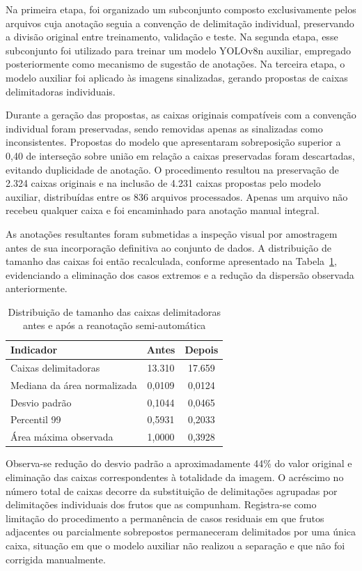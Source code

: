 \documentclass[artigo,times,capa]{iftex2024}
\begin{document}
Na primeira etapa, foi organizado um subconjunto composto exclusivamente
pelos arquivos cuja anotação seguia a convenção de delimitação individual,
preservando a divisão original entre treinamento, validação e teste. Na
segunda etapa, esse subconjunto foi utilizado para treinar um modelo
YOLOv8n auxiliar, empregado posteriormente como mecanismo de sugestão de
anotações. Na terceira etapa, o modelo auxiliar foi aplicado às imagens
sinalizadas, gerando propostas de caixas delimitadoras individuais.

Durante a geração das propostas, as caixas originais compatíveis com a
convenção individual foram preservadas, sendo removidas apenas as
sinalizadas como inconsistentes. Propostas do modelo que apresentaram
sobreposição superior a 0,40 de interseção sobre união em relação a caixas
preservadas foram descartadas, evitando duplicidade de anotação. O
procedimento resultou na preservação de 2.324 caixas originais e na
inclusão de 4.231 caixas propostas pelo modelo auxiliar, distribuídas
entre os 836 arquivos processados. Apenas um arquivo não recebeu qualquer
caixa e foi encaminhado para anotação manual integral.

As anotações resultantes foram submetidas a inspeção visual por amostragem
antes de sua incorporação definitiva ao conjunto de dados. A distribuição
de tamanho das caixas foi então recalculada, conforme apresentado na
Tabela~\ref{tab:distribuicao_bbox}, evidenciando a eliminação dos casos
extremos e a redução da dispersão observada anteriormente.

\begin{table}[H]
\centering
\caption{Distribuição de tamanho das caixas delimitadoras antes e após a reanotação semi-automática}
\label{tab:distribuicao_bbox}
\begin{tabular}{lcc}
\toprule
\textbf{Indicador} & \textbf{Antes} & \textbf{Depois} \\
\midrule
Caixas delimitadoras & 13.310 & 17.659 \\
Mediana da área normalizada & 0,0109 & 0,0124 \\
Desvio padrão & 0,1044 & 0,0465 \\
Percentil 99 & 0,5931 & 0,2033 \\
Área máxima observada & 1,0000 & 0,3928 \\
\bottomrule
\end{tabular}
\end{table}

Observa-se redução do desvio padrão a aproximadamente 44\% do valor
original e eliminação das caixas correspondentes à totalidade da imagem. O
acréscimo no número total de caixas decorre da substituição de
delimitações agrupadas por delimitações individuais dos frutos que as
compunham. Registra-se como limitação do procedimento a permanência de
casos residuais em que frutos adjacentes ou parcialmente sobrepostos
permaneceram delimitados por uma única caixa, situação em que o modelo
auxiliar não realizou a separação e que não foi corrigida manualmente.
\end{document}
